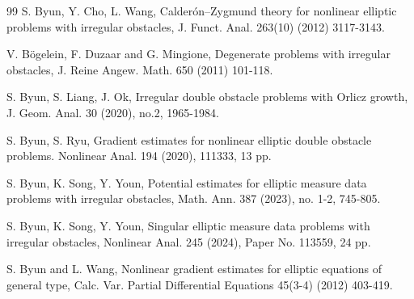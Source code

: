 \documentclass[10pt,a4paper]{article}
\theoremstyle{definition}
\numberwithin{equation}{section}
\begin{document}
\begin{thebibliography}{99}
 S. Byun, Y. Cho,   L. Wang, Calder\'on–Zygmund theory for nonlinear elliptic
problems with irregular obstacles, J. Funct. Anal. 263(10) (2012) 3117-3143.

 V. B{\"o}gelein, F. Duzaar and G. Mingione, Degenerate problems with irregular obstacles,
J. Reine Angew. Math. 650 (2011) 101-118.

 S. Byun, S. Liang, J. Ok,
Irregular double obstacle problems with Orlicz growth, 
J. Geom. Anal. 30 (2020), no.2, 1965-1984.



 S. Byun,  S. Ryu,  Gradient estimates for nonlinear elliptic double obstacle problems. Nonlinear Anal. 194 (2020), 111333, 13 pp.

 S. Byun, K. Song, Y.  Youn,  Potential estimates for elliptic measure data problems with irregular obstacles,  Math. Ann. 387 (2023), no. 1-2, 745-805.

 S. Byun, K. Song, Y.  Youn, Singular elliptic measure data problems with irregular obstacles, Nonlinear Anal. 245 (2024), Paper No. 113559, 24 pp.


 S. Byun and L. Wang, Nonlinear gradient estimates for elliptic equations of general
type, Calc. Var. Partial Differential Equations 45(3-4) (2012) 403-419. 





\end{thebibliography}
\end{document}
